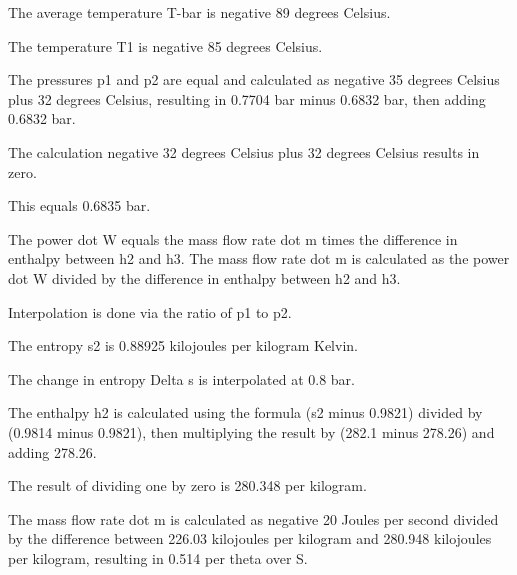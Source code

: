 The average temperature T-bar is negative 89 degrees Celsius.

The temperature T1 is negative 85 degrees Celsius.

The pressures p1 and p2 are equal and calculated as negative 35 degrees Celsius plus 32 degrees Celsius, resulting in 0.7704 bar minus 0.6832 bar, then adding 0.6832 bar.

The calculation negative 32 degrees Celsius plus 32 degrees Celsius results in zero.

This equals 0.6835 bar.

The power dot W equals the mass flow rate dot m times the difference in enthalpy between h2 and h3. The mass flow rate dot m is calculated as the power dot W divided by the difference in enthalpy between h2 and h3.

Interpolation is done via the ratio of p1 to p2.

The entropy s2 is 0.88925 kilojoules per kilogram Kelvin.

The change in entropy Delta s is interpolated at 0.8 bar.

The enthalpy h2 is calculated using the formula (s2 minus 0.9821) divided by (0.9814 minus 0.9821), then multiplying the result by (282.1 minus 278.26) and adding 278.26.

The result of dividing one by zero is 280.348 per kilogram.

The mass flow rate dot m is calculated as negative 20 Joules per second divided by the difference between 226.03 kilojoules per kilogram and 280.948 kilojoules per kilogram, resulting in 0.514 per theta over S.